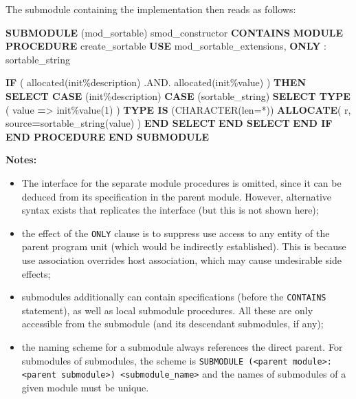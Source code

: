 \documentclass[
]{article}
\newenvironment{Shaded}{}{}
\newcommand{\DataTypeTok}[1]{\textcolor[rgb]{0.56,0.13,0.00}{#1}}
\newcommand{\DecValTok}[1]{\textcolor[rgb]{0.25,0.63,0.44}{#1}}
\newcommand{\FunctionTok}[1]{\textcolor[rgb]{0.02,0.16,0.49}{#1}}
\newcommand{\KeywordTok}[1]{\textcolor[rgb]{0.00,0.44,0.13}{\textbf{#1}}}
\newcommand{\NormalTok}[1]{#1}
\newcommand{\OperatorTok}[1]{\textcolor[rgb]{0.40,0.40,0.40}{#1}}
\newcommand{\StringTok}[1]{\textcolor[rgb]{0.25,0.44,0.63}{#1}}
\providecommand{\tightlist}{%
  \setlength{\itemsep}{0pt}\setlength{\parskip}{0pt}}
\begin{document}
The submodule containing the implementation then reads as follows:

\begin{Shaded}
\begin{Highlighting}[]
\KeywordTok{SUBMODULE}\NormalTok{ (mod\_sortable) smod\_constructor}
\KeywordTok{CONTAINS}
   \KeywordTok{MODULE PROCEDURE}\NormalTok{ create\_sortable}
      \KeywordTok{USE}\NormalTok{ mod\_sortable\_extensions, }\KeywordTok{ONLY}\NormalTok{ : sortable\_string}

      \KeywordTok{IF}\NormalTok{ ( }\FunctionTok{allocated}\NormalTok{(init}\OperatorTok{\%}\NormalTok{description) }\OperatorTok{.AND.} \FunctionTok{allocated}\NormalTok{(init}\OperatorTok{\%}\DataTypeTok{value}\NormalTok{) ) }\KeywordTok{THEN}
         \KeywordTok{SELECT CASE}\NormalTok{ (init}\OperatorTok{\%}\NormalTok{description)}
         \KeywordTok{CASE}\NormalTok{ (}\StringTok{\textquotesingle{}sortable\_string\textquotesingle{}}\NormalTok{)}
            \KeywordTok{SELECT TYPE}\NormalTok{ ( }\DataTypeTok{value} \KeywordTok{=}\OperatorTok{\textgreater{}}\NormalTok{ init}\OperatorTok{\%}\DataTypeTok{value}\NormalTok{(}\DecValTok{1}\NormalTok{) )}
            \KeywordTok{TYPE IS}\NormalTok{ (}\DataTypeTok{CHARACTER(len=*)}\NormalTok{)}
               \KeywordTok{ALLOCATE}\NormalTok{( r, source}\KeywordTok{=}\NormalTok{sortable\_string(}\DataTypeTok{value}\NormalTok{) )}
            \KeywordTok{END SELECT}
         \KeywordTok{END SELECT}
      \KeywordTok{END IF}
   \KeywordTok{END PROCEDURE}
\KeywordTok{END SUBMODULE}
\end{Highlighting}
\end{Shaded}

\textbf{Notes:}

\begin{itemize}
\tightlist
\item
  The interface for the separate module procedures is omitted, since it
  can be deduced from its specification in the parent module. However,
  alternative syntax exists that replicates the interface (but this is
  not shown here);
\item
  the effect of the \texttt{ONLY} clause is to suppress use access to
  any entity of the parent program unit (which would be indirectly
  established). This is because use association overrides host
  association, which may cause undesirable side effects;
\item
  submodules additionally can contain specifications (before the
  \texttt{CONTAINS} statement), as well as local submodule procedures.
  All these are only accessible from the submodule (and its descendant
  submodules, if any);
\item
  the naming scheme for a submodule always references the direct parent.
  For submodules of submodules, the scheme is
  \texttt{SUBMODULE\ (\textless{}parent\ module\textgreater{}:\textless{}parent\ submodule\textgreater{})\ \textless{}submodule\_name\textgreater{}}
  and the names of submodules of a given module must be unique.
\end{itemize}
\end{document}
